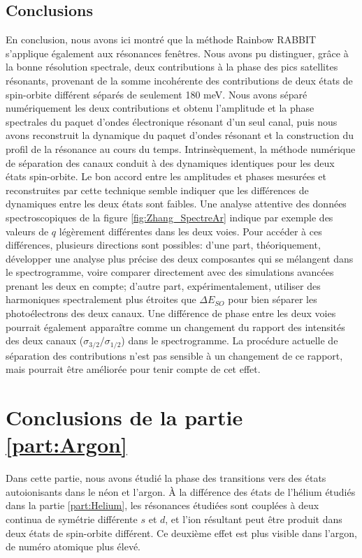 \subsection{Conclusions}
En conclusion, nous avons ici montré que la méthode Rainbow RABBIT s'applique également aux résonances fenêtres. Nous avons pu distinguer, grâce à la bonne résolution spectrale, deux contributions à la phase des pics satellites résonants, provenant de la somme incohérente des contributions de deux états de spin-orbite différent séparés de seulement 180 meV. Nous avons séparé numériquement les deux contributions et obtenu l'amplitude et la phase spectrales du paquet d'ondes électronique résonant d'un seul canal, puis nous avons reconstruit la dynamique du paquet d'ondes résonant et la construction du profil de la résonance au cours du temps. Intrinsèquement, la méthode numérique de séparation des canaux conduit à des dynamiques identiques pour les deux états spin-orbite. Le bon accord entre les amplitudes et phases mesurées et reconstruites par cette technique semble indiquer que les différences de dynamiques entre les deux états sont faibles. Une analyse attentive des données spectroscopiques de la figure \ref{fig:Zhang_SpectreAr} indique par exemple des valeurs de $q$ légèrement différentes dans les deux voies. Pour accéder à ces différences, plusieurs directions sont possibles: d'une part, théoriquement, développer une analyse plus précise des deux composantes qui se mélangent dans le spectrogramme, voire comparer directement avec des simulations avancées prenant les deux en compte; d'autre part, expérimentalement, utiliser des harmoniques spectralement plus étroites que $\Delta E_{SO}$ pour bien séparer les photoélectrons des deux canaux. Une différence de phase entre les deux voies pourrait également apparaître comme un changement du rapport des intensités des deux canaux ($\sigma_{3/2}/\sigma_{1/2}$) dans le spectrogramme. La procédure actuelle de séparation des contributions n'est pas sensible à un changement de ce rapport, mais pourrait être améliorée pour tenir compte de cet effet.

\section*{Conclusions de la partie \ref{part:Argon}}
Dans cette partie, nous avons étudié la phase des transitions vers des états autoionisants dans le néon et l'argon. \`{A} la différence des états de l'hélium étudiés dans la partie \ref{part:Helium}, les résonances étudiées sont couplées à deux continua de symétrie différente $s$ et $d$, et l'ion résultant peut être produit dans deux états de spin-orbite différent. Ce deuxième effet est plus visible dans l'argon, de numéro atomique plus élevé.

